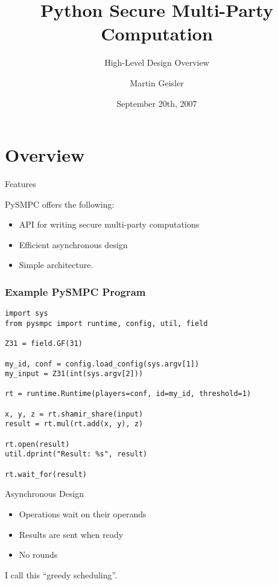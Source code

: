 \documentclass[t,noamsthm]{beamer}
\title[PySMPC]{Python Secure Multi-Party Computation}
\subtitle{High-Level Design Overview}
\author{Martin Geisler}
\institute[BRICS]{
  BRICS\\
  Department of Computer Science\\
  University of Aarhus
}
\date{September 20th, 2007}
\begin{document}
\begin{frame}
  \titlepage
\end{frame}


\section{Overview}

\begin{frame}{Features}

  PySMPC offers the following:
  \begin{itemize}
  \item API for writing secure multi-party computations
  \item Efficient asynchronous design
  \item Simple architecture.
  \end{itemize}

\end{frame}

\begin{frame}[fragile]

\frametitle{Example PySMPC Program}

\begin{lstlisting}
import sys
from pysmpc import runtime, config, util, field

Z31 = field.GF(31)

my_id, conf = config.load_config(sys.argv[1])
my_input = Z31(int(sys.argv[2]))

rt = runtime.Runtime(players=conf, id=my_id, threshold=1)

x, y, z = rt.shamir_share(input)
result = rt.mul(rt.add(x, y), z)

rt.open(result)
util.dprint("Result: %s", result)

rt.wait_for(result)
\end{lstlisting}

\end{frame}

\begin{frame}{Asynchronous Design}
  \begin{itemize}
  \item Operations wait on their operands
  \item Results are sent when ready
  \item No rounds
  \end{itemize}
  I call this ``greedy scheduling''.
\end{frame}
\end{document}
